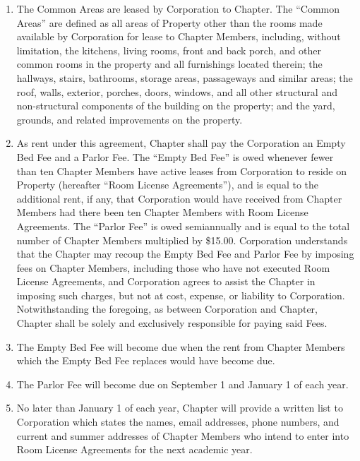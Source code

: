 \documentclass[12pt]{article}
\begin{document}
\begin{enumerate}
        \item The Common Areas are leased by Corporation to Chapter. The ``Common Areas'' are defined as all areas of Property other than the rooms made available by Corporation for lease to Chapter Members, including, without limitation, the kitchens, living rooms, front and back porch, and other common rooms in the property and all furnishings located therein; the hallways, stairs, bathrooms, storage areas, passageways and similar areas; the roof, walls, exterior, porches, doors, windows, and all other structural and non-structural components of the building on the property; and the yard, grounds, and related improvements on the property.

        \item As rent under this agreement, Chapter shall pay the Corporation an Empty Bed Fee and a Parlor Fee.
                The ``Empty Bed Fee'' is owed whenever fewer than ten Chapter Members have active leases from Corporation to reside on Property (hereafter ``Room License Agreements''), and is equal to the additional rent, if any, that Corporation would have received from Chapter Members had there been ten Chapter Members with Room License Agreements.
                The ``Parlor Fee'' is owed semiannually and is equal to the total number of Chapter Members multiplied by \$15.00.
                Corporation understands that the Chapter may recoup the Empty Bed Fee and Parlor Fee by imposing fees on Chapter Members, including those who have not executed Room License Agreements, and Corporation agrees to assist the Chapter in imposing such charges, but not at  cost, expense, or liability to Corporation.
                Notwithstanding the foregoing, as between Corporation and Chapter, Chapter shall be solely and exclusively responsible for paying said Fees.

        \item The Empty Bed Fee will become due when the rent from Chapter Members which the Empty Bed Fee replaces would have become due.

        \item The Parlor Fee will become due on September 1 and January 1 of each year.

        \item No later than January 1 of each year, Chapter will provide a written list to Corporation which states the names, email addresses, phone numbers, and current and summer addresses of Chapter Members who intend to enter into Room License Agreements for the next academic year.


\end{enumerate}
\end{document}

